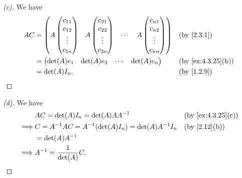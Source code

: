 \begin{proof}[(c)]
  We have
  \begin{align*}
    AC & = \begin{pmatrix}
             A \begin{pmatrix}
          c_{1 1} \\
          c_{1 2} \\
          \vdots  \\
          c_{1 n}
        \end{pmatrix} & A \begin{pmatrix}
                            c_{2 1} \\
                            c_{2 2} \\
                            \vdots  \\
                            c_{2 n}
                          \end{pmatrix} & \cdots & A \begin{pmatrix}
                                                       c_{n 1} \\
                                                       c_{n 2} \\
                                                       \vdots  \\
                                                       c_{n n}
                                                     \end{pmatrix}
           \end{pmatrix} &  & \text{(by \cref{2.3.1})}                              \\
       & = \begin{pmatrix}
             \det(A) e_1 & \det(A) e_2 & \cdots & \det(A) e_n
           \end{pmatrix}                                                   &  & \text{(by \cref{ex:4.3.25}(b))}                            \\
       & = \det(A) I_n.                                                                                      &  & \text{(by \cref{1.2.9})}
  \end{align*}
\end{proof}

\begin{proof}[(d)]
  We have
  \begin{align*}
             & AC = \det(A) I_n = \det(A) A A^{-1}                       &  & \text{(by \cref{ex:4.3.25}(c))} \\
    \implies & C = A^{-1} AC = A^{-1} (\det(A) I_n) = \det(A) A^{-1} I_n &  & \text{(by \cref{2.12}(b))}      \\
             & = \det(A) A^{-1}                                                                               \\
    \implies & A^{-1} = \frac{1}{\det(A)} C.
  \end{align*}
\end{proof}

